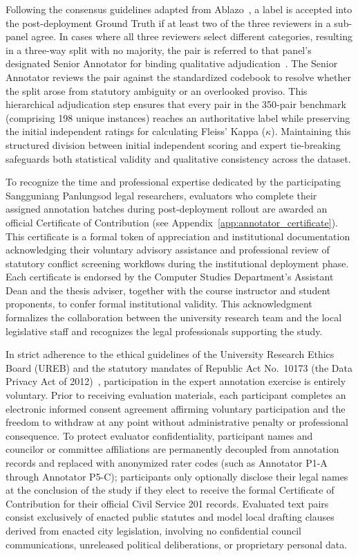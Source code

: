     Following the consensus guidelines adapted from Ablazo~\cite{ablazo2019designing}, a label is accepted into the post-deployment Ground Truth if at least two of the three reviewers in a sub-panel agree. In cases where all three reviewers select different categories, resulting in a three-way split with no majority, the pair is referred to that panel's designated Senior Annotator for binding qualitative adjudication~\cite{gao2022hierarchical, artstein2008inter}. The Senior Annotator reviews the pair against the standardized codebook to resolve whether the split arose from statutory ambiguity or an overlooked proviso. This hierarchical adjudication step ensures that every pair in the 350-pair benchmark (comprising 198 unique instances) reaches an authoritative label while preserving the initial independent ratings for calculating Fleiss' Kappa ($\kappa$). Maintaining this structured division between initial independent scoring and expert tie-breaking safeguards both statistical validity and qualitative consistency across the dataset.

    To recognize the time and professional expertise dedicated by the participating Sangguniang Panlungsod legal researchers, evaluators who complete their assigned annotation batches during post-deployment rollout are awarded an official Certificate of Contribution (see Appendix~\ref{app:annotator_certificate}). This certificate is a formal token of appreciation and institutional documentation acknowledging their voluntary advisory assistance and professional review of statutory conflict screening workflows during the institutional deployment phase. Each certificate is endorsed by the Computer Studies Department's Assistant Dean and the thesis adviser, together with the course instructor and student proponents, to confer formal institutional validity. This acknowledgment formalizes the collaboration between the university research team and the local legislative staff and recognizes the legal professionals supporting the study.

    In strict adherence to the ethical guidelines of the University Research Ethics Board (UREB) and the statutory mandates of Republic Act No.~10173 (the Data Privacy Act of 2012)~\cite{philgov2012ra10173}, participation in the expert annotation exercise is entirely voluntary. Prior to receiving evaluation materials, each participant completes an electronic informed consent agreement affirming voluntary participation and the freedom to withdraw at any point without administrative penalty or professional consequence. To protect evaluator confidentiality, participant names and councilor or committee affiliations are permanently decoupled from annotation records and replaced with anonymized rater codes (such as Annotator P1-A through Annotator P5-C); participants only optionally disclose their legal names at the conclusion of the study if they elect to receive the formal Certificate of Contribution for their official Civil Service 201 records. Evaluated text pairs consist exclusively of enacted public statutes and model local drafting clauses derived from enacted city legislation, involving no confidential council communications, unreleased political deliberations, or proprietary personal data.

